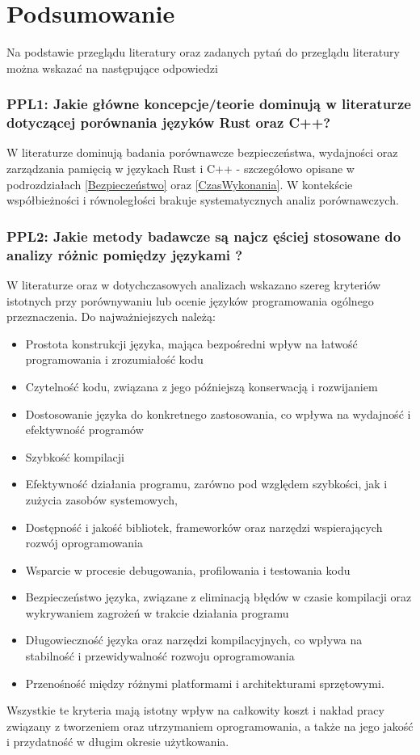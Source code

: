\section{Podsumowanie}
Na podstawie przeglądu literatury oraz zadanych pytań do przeglądu literatury można wskazać na następujące odpowiedzi
\subsubsection{PPL1: Jakie główne koncepcje/teorie dominują w literaturze dotyczącej porównania języków Rust oraz C++?}
W literaturze dominują badania porównawcze bezpieczeństwa, wydajności oraz zarządzania pamięcią w językach Rust i C++ \cite{PPL1_1} - szczegółowo opisane w podrozdziałach \ref{Bezpieczeństwo} oraz \ref{CzasWykonania}. W kontekście współbieżności i równoległości brakuje systematycznych analiz porównawczych.

\subsubsection{PPL2: Jakie metody badawcze są najcz
ęściej stosowane do analizy różnic pomiędzy językami ?}
W literaturze oraz w dotychczasowych analizach \cite{LanguageComparison_1,LanguageComparison_2,LanguageComparison_3,LanguageComparison_4} wskazano szereg kryteriów istotnych przy porównywaniu lub ocenie języków programowania ogólnego przeznaczenia. Do najważniejszych należą: 
    \begin{itemize}
        \item Prostota konstrukcji języka, mająca bezpośredni wpływ na łatwość programowania i zrozumiałość kodu
        \item Czytelność kodu, związana z jego późniejszą konserwacją i rozwijaniem
        \item Dostosowanie języka do konkretnego zastosowania, co wpływa na wydajność i efektywność programów
        \item Szybkość kompilacji
        \item Efektywność działania programu, zarówno pod względem szybkości, jak i zużycia zasobów systemowych,
        \item Dostępność i jakość bibliotek, frameworków oraz narzędzi wspierających rozwój oprogramowania
        \item Wsparcie w procesie debugowania, profilowania i testowania kodu
        \item Bezpieczeństwo języka, związane z eliminacją błędów w czasie kompilacji oraz wykrywaniem zagrożeń w trakcie działania programu
        \item Długowieczność języka oraz narzędzi kompilacyjnych, co wpływa na stabilność i przewidywalność rozwoju oprogramowania
        \item Przenośność między różnymi platformami i architekturami sprzętowymi.
    \end{itemize}
    Wszystkie te kryteria mają istotny wpływ na całkowity koszt i nakład pracy związany z tworzeniem oraz utrzymaniem oprogramowania, a także na jego jakość i przydatność w długim okresie użytkowania.

